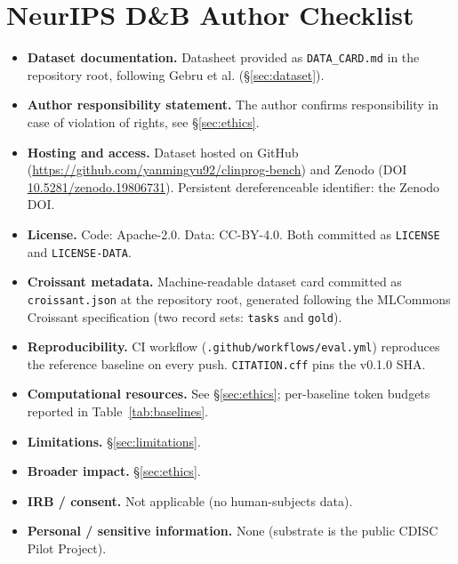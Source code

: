 \section{NeurIPS D\&B Author Checklist}
\label{sec:checklist}


\begin{itemize}
  \item \textbf{Dataset documentation.} Datasheet provided as
        \texttt{DATA\_CARD.md} in the repository root, following Gebru et al.
        (\S\ref{sec:dataset}).
  \item \textbf{Author responsibility statement.} The author confirms
        responsibility in case of violation of rights, see
        \S\ref{sec:ethics}.
  \item \textbf{Hosting and access.} Dataset hosted on
        GitHub (\url{https://github.com/yanmingyu92/clinprog-bench}) and
        Zenodo (DOI \href{https://doi.org/10.5281/zenodo.19806731}{10.5281/zenodo.19806731}).
        Persistent dereferenceable identifier: the Zenodo DOI.
  \item \textbf{License.} Code: Apache-2.0. Data: CC-BY-4.0. Both committed
        as \texttt{LICENSE} and \texttt{LICENSE-DATA}.
  \item \textbf{Croissant metadata.} Machine-readable dataset card committed as
        \texttt{croissant.json} at the repository root, generated following the
        MLCommons Croissant specification (two record sets: \texttt{tasks}
        and \texttt{gold}).
  \item \textbf{Reproducibility.} CI workflow
        (\texttt{.github/workflows/eval.yml}) reproduces the reference
        baseline on every push. \texttt{CITATION.cff} pins the v0.1.0 SHA.
  \item \textbf{Computational resources.} See \S\ref{sec:ethics};
        per-baseline token budgets reported in
        Table~\ref{tab:baselines}.
  \item \textbf{Limitations.} \S\ref{sec:limitations}.
  \item \textbf{Broader impact.} \S\ref{sec:ethics}.
  \item \textbf{IRB / consent.} Not applicable (no human-subjects data).
  \item \textbf{Personal / sensitive information.} None
        (substrate is the public CDISC Pilot Project).
\end{itemize}
